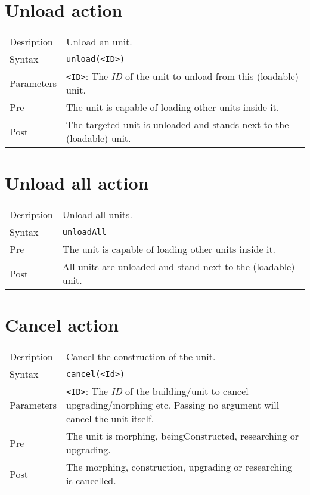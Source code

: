 \section{Unload action}
\begin{tabularx}{\textwidth}{lX}
 Desription & Unload an unit. \\
 Syntax & \verb|unload(<ID>)| \\
 Parameters & \verb|<ID>|: The \textit{ID} of the unit to unload from this (loadable) unit.\\
 Pre & The unit is capable of loading other units inside it. \\
 Post & The targeted unit is unloaded and stands next to the (loadable) unit.
\end{tabularx}

\section{Unload all action}
\begin{tabularx}{\textwidth}{lX}
 Desription & Unload all units. \\
 Syntax & \verb|unloadAll| \\
 Pre & The unit is capable of loading other units inside it. \\
 Post & All units are unloaded and stand next to the (loadable) unit.
\end{tabularx}

\section{Cancel action}
\begin{tabularx}{\textwidth}{lX}
 Desription & Cancel the construction of the unit. \\
 Syntax & \verb|cancel(<Id>)| \\
 Parameters & \verb|<ID>|: The \textit{ID} of the building/unit to cancel upgrading/morphing etc. Passing no argument will cancel the unit itself. \\
 Pre & The unit is morphing, beingConstructed, researching or upgrading. \\
 Post & The morphing, construction, upgrading or researching is cancelled.
\end{tabularx}

